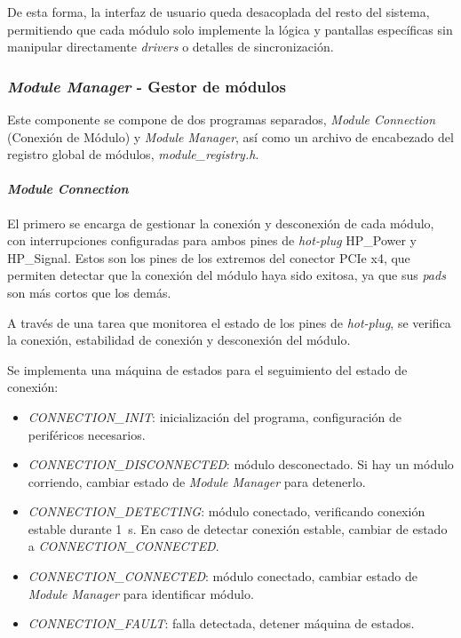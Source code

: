 De esta forma, la interfaz de usuario queda desacoplada del resto del sistema, permitiendo que cada módulo solo implemente la lógica y pantallas específicas sin manipular directamente \textit{drivers} o detalles de sincronización.

\subsubsection{\textit{Module Manager} - Gestor de módulos}

Este componente se compone de dos programas separados, \textit{Module Connection} (Conexión de Módulo) y \textit{Module Manager}, así como un archivo de encabezado del registro global de módulos, \textit{module\_registry.h}.

\paragraph{\textit{Module Connection}}

El primero se encarga de gestionar la conexión y desconexión de cada módulo, con interrupciones configuradas para ambos pines de \textit{hot-plug} HP\_Power y HP\_Signal. Estos son los pines de los extremos del conector PCIe x4, que permiten detectar que la conexión del módulo haya sido exitosa, ya que sus \textit{pads} son más cortos que los demás.

A través de una tarea que monitorea el estado de los pines de \textit{hot-plug}, se verifica la conexión, estabilidad de conexión y desconexión del módulo.

Se implementa una máquina de estados para el seguimiento del estado de conexión:
\begin{itemize}[noitemsep]
    \item \textit{CONNECTION\_INIT}: inicialización del programa, configuración de periféricos necesarios.
    \item \textit{CONNECTION\_DISCONNECTED}: módulo desconectado. Si hay un módulo corriendo, cambiar estado de \textit{Module Manager} para detenerlo.
    \item \textit{CONNECTION\_DETECTING}: módulo conectado, verificando conexión estable durante \SI{1}{\second}. En caso de detectar conexión estable, cambiar de estado a \textit{CONNECTION\_CONNECTED}.
    \item \textit{CONNECTION\_CONNECTED}: módulo conectado, cambiar estado de \textit{Module Manager} para identificar módulo.
    \item \textit{CONNECTION\_FAULT}: falla detectada, detener máquina de estados.
\end{itemize}

